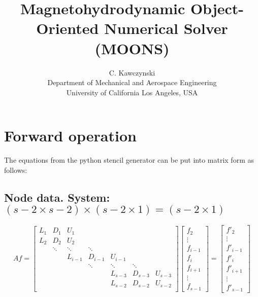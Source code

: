 \documentclass[11pt]{article}
\begin{document}
\doublespacing
\title{Magnetohydrodynamic Object-Oriented Numerical Solver (MOONS)}
\author{C. Kawczynski \\
Department of Mechanical and Aerospace Engineering \\
University of California Los Angeles, USA\\
}
\section{Forward operation}
The equations from the python stencil generator can be put into matrix form as follows:

\subsection{Node data. System:
\texorpdfstring{$ (s-2 \times s-2) \times (s-2 \times 1) = (s-2 \times 1)$}{}}
\[ Af = \left[
\begin{array}{ccccccccc}
L_{1} & D_{1}    & U_{1}     &           &           &           &         \\
L_{2} & D_{2}    & U_{2}     &           &           &           &         \\
      & \ddots   & \ddots    & \ddots    &           &           &         \\
      &          & L_{i-1}   & D_{i-1}   & U_{i-1}   &           &         \\
      &          &           & \ddots    & \ddots    & \ddots    &         \\
      &          &           &           & L_{s-3}   & D_{s-3}   & U_{s-3} \\
      &          &           &           & L_{s-2}   & D_{s-2}   & U_{s-2} \\
\end{array} \right] 
\left[ \begin{array}{c}
f_{2} \\ \vdots \\ f_{i-1} \\ f_{i} \\ f_{i+1} \\ \vdots \\ f_{s-1}
\end{array} \right]
=
\left[ \begin{array}{c}
f'_{2} \\ \vdots \\ f'_{i-1} \\ f'_{i} \\ f'_{i+1} \\ \vdots \\ f'_{s-1}
\end{array} \right]
\]
\end{document}
